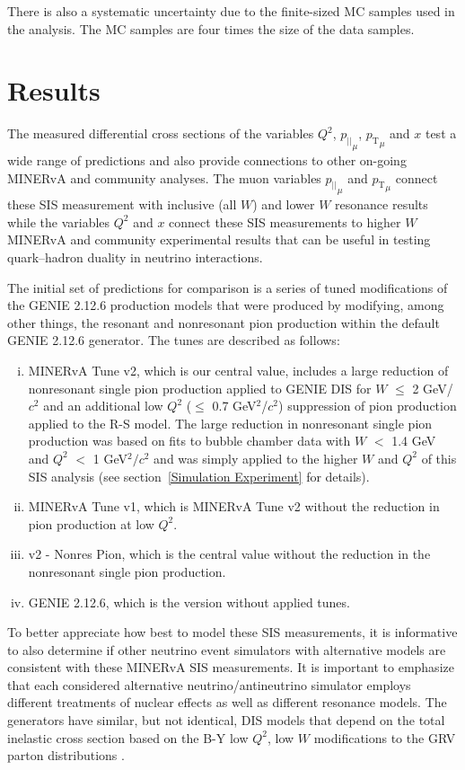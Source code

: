 \documentclass[aps, prd, twocolumn, showpacs, superscriptaddress, floatfix]{revtex4-2}
\begin{document}
There is also a systematic uncertainty due to the finite-sized MC samples used in the analysis. The MC samples are four times the size of the data samples.

\section{Results}
The measured differential cross sections of the variables $Q^2$, ${p_{||}}_\mu$, ${p_\mathrm{T}}_\mu$ and $x$ test a wide range of predictions and also provide connections to other on-going MINERvA and community analyses. The muon variables ${p_{||}}_\mu$ and ${p_\mathrm{T}}_\mu$ connect these SIS measurement with inclusive (all $W$) and lower $W$ resonance results while the variables $Q^2$ and $x$ connect these SIS measurements to higher $W$ MINERvA and community experimental results that can be useful in testing quark–hadron duality in neutrino interactions.  

The initial set of predictions for comparison is a series of tuned modifications of the GENIE 2.12.6 production models that were produced by modifying, among other things, the resonant and nonresonant pion production within the default GENIE 2.12.6 generator. The tunes are described as follows:
\begin{enumerate}[(i)]
    \item MINERvA Tune v2, which is our central value, includes a large reduction of nonresonant single pion production applied to GENIE DIS for $W$ $\leq$ 2 GeV/$c^2$ and an additional low $Q^2$ ($\leq$ 0.7 GeV$^2$/$c^2$) suppression of pion production applied to the R-S model. The large reduction in nonresonant single pion production was based on fits to bubble chamber data with $W$ $<$ 1.4 GeV and $Q^2$ $<$ 1 GeV$^2/c^2$ and was simply applied to the higher $W$ and $Q^2$ of this SIS analysis (see section~\ref{Simulation Experiment} for details).
    \item MINERvA Tune v1, which is MINERvA Tune v2 without the reduction in pion production at low $Q^2$.
    \item v2 - Nonres Pion, which is the central value without the reduction in the nonresonant single pion production.
    \item GENIE 2.12.6, which is the version without applied tunes.
\end{enumerate}

To better appreciate how best to model these SIS measurements, it is informative to also determine if other neutrino event simulators with alternative models are consistent with these MINERvA SIS measurements. It is important to emphasize that each considered alternative neutrino/antineutrino simulator employs different treatments of nuclear effects as well as different resonance models. The generators have similar, but not identical, DIS models that depend on the total inelastic cross section based on the B-Y low $Q^2$, low $W$ modifications to the GRV parton distributions \cite{Bodek:2010km}.
\end{document}
